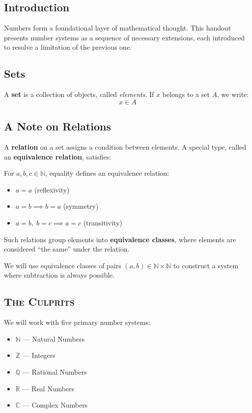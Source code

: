 \documentclass[11pt]{article}
\newcommand{\N}{\mathbb{N}}
\newcommand{\Z}{\mathbb{Z}}
\newcommand{\Q}{\mathbb{Q}}
\newcommand{\R}{\mathbb{R}}
\newcommand{\C}{\mathbb{C}}
\begin{document}
\subsection*{Introduction}

Numbers form a foundational layer of mathematical thought. 
This handout presents number systems as a sequence of necessary extensions, 
each introduced to resolve a limitation of the previous one.

\subsection*{Sets}

A \textbf{set} is a collection of objects, called \textit{elements}. 
If $x$ belongs to a set $A$, we write:
\[
x \in A
\]

\subsection*{A Note on Relations}

A \textbf{relation} on a set assigns a condition between elements. 
A special type, called an \textbf{equivalence relation}, satisfies:

For $a,b,c \in \N$, equality defines an equivalence relation:

\begin{itemize}
    \item $a = a$ \hfill (reflexivity)
    \item $a = b \implies b = a$ \hfill (symmetry)
    \item $a = b,\; b = c \implies a = c$ \hfill (transitivity)
\end{itemize}

Such relations group elements into \textbf{equivalence classes}, 
where elements are considered “the same” under the relation. 

\begin{remarkbox}
We will use equivalence classes of pairs $(a,b) \in \N \times \N$ 
to construct a system where subtraction is always possible.
\end{remarkbox}

\subsection*{\textsc{The Culprits}}

We will work with five primary number systems:

\begin{itemize}
    \item $\N$ — Natural Numbers
    \item $\Z$ — Integers
    \item $\Q$ — Rational Numbers
    \item $\R$ — Real Numbers
    \item $\C$ — Complex Numbers
\end{itemize}
\end{document}
